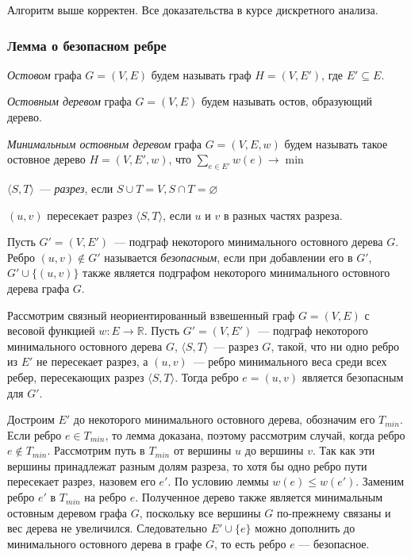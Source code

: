 \Statement Алгоритм выше корректен.
Все доказательства в курсе дискретного анализа.



\subsubsection{Лемма о безопасном ребре}

\textit{Остовом} графа $G = (V, E)$ будем называть граф $H = (V, E')$, где $E' \subseteq E$.

\textit{Остовным деревом} графа $G = (V, E)$ будем называть остов, образующий дерево.

\textit{Минимальным остовным деревом} графа $G = (V, E, w)$ будем называть такое остовное дерево $H = (V, E', w)$, что $\sum\limits_{e \in E'}w(e) \to \min$

 $\langle S, T \rangle$~--- \textit{разрез}, если $S \cup T = V, S \cap T = \varnothing$
    
$(u,v)$ пересекает разрез $\langle S, T \rangle$, если $u$ и $v$ в разных частях разреза. 
    
 Пусть $G' = (V, E')$~--- подграф некоторого минимального остовного дерева $G$. Ребро $ (u, v) \notin G' $ называется \emph{безопасным}, если при добавлении его в $G'$, $G' \cup \{ (u, v)\}$ также является подграфом некоторого минимального остовного дерева графа $G$.

\Lemma Рассмотрим связный неориентированный взвешенный граф $G = (V, E)$ с весовой функцией $w : E \to \mathbb{R}$. Пусть $G' = (V, E')$~--- подграф некоторого минимального остовного дерева $G$, $\langle S, T \rangle$~--- разрез $G$, такой, что ни одно ребро из $E'$ не пересекает разрез, а $(u, v)$~--- ребро минимального веса среди всех ребер, пересекающих разрез $\langle S, T \rangle$. Тогда ребро $e = (u, v)$ является безопасным для $ G'$.
    
\Proof Достроим $ E' $ до некоторого минимального остовного дерева, обозначим его $T_{min}$. Если ребро $e \in T_{min}$, то лемма доказана, поэтому рассмотрим случай, когда ребро $e \notin T_{min}$. Рассмотрим путь в $T_{min}$ от вершины $u$ до вершины $v$. Так как эти вершины принадлежат разным долям разреза, то хотя бы одно ребро пути пересекает разрез, назовем его $e'$. По условию леммы $w(e) \leqslant w(e')$. Заменим ребро $e'$ в $T_{min}$ на ребро $e$. Полученное дерево также является минимальным остовным деревом графа $G$, поскольку все вершины $G$ по-прежнему связаны и вес дерева не увеличился. Следовательно $E' \cup \{e\} $ можно дополнить до минимального остовного дерева в графе $G$, то есть ребро $e$ --- безопасное. 
\Endproof


